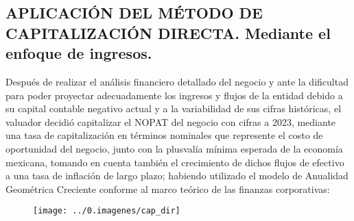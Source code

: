 \subsection{APLICACIÓN DEL MÉTODO DE CAPITALIZACIÓN DIRECTA. Mediante el enfoque de ingresos.} 

Después de realizar el análisis financiero detallado del negocio y ante la dificultad para poder proyectar adecuadamente los ingresos y flujos de la entidad debido a su capital contable negativo actual y a la variabilidad de sus cifras históricas, el valuador decidió capitalizar el NOPAT del negocio con cifras a 2023, mediante una tasa de capitalización en términos nominales que represente el costo de oportunidad del negocio, junto con la plusvalía mínima esperada de la economía mexicana, tomando en cuenta también el crecimiento de dichos flujos de efectivo a una tasa de inflación de largo plazo; habiendo utilizado el modelo de Anualidad Geométrica Creciente conforme al marco teórico de las finanzas corporativas:



\begin{figure}[H]
\centering
\texttt{[image: ../0.imagenes/cap\_dir]}
\end{figure}

